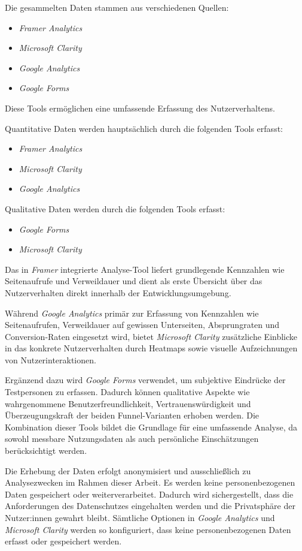 Die gesammelten Daten stammen aus verschiedenen Quellen:
\begin{itemize}
    \item \textit{Framer Analytics}
    \item \textit{Microsoft Clarity}
    \item \textit{Google Analytics}
    \item \textit{Google Forms}
\end{itemize} 
Diese Tools ermöglichen eine umfassende Erfassung des Nutzerverhaltens.

Quantitative Daten werden hauptsächlich durch die folgenden Tools erfasst:
\begin{itemize}
    \item \textit{Framer Analytics}
    \item \textit{Microsoft Clarity}
    \item \textit{Google Analytics}
\end{itemize}

Qualitative Daten werden durch die folgenden Tools erfasst:
\begin{itemize}
    \item \textit{Google Forms}
    \item \textit{Microsoft Clarity}
\end{itemize}

Das in \textit{Framer} integrierte Analyse-Tool liefert grundlegende 
Kennzahlen wie Seitenaufrufe und Verweildauer und dient als erste 
Übersicht über das Nutzerverhalten direkt innerhalb der Entwicklungsumgebung.

Während \textit{Google Analytics} 
primär zur Erfassung von Kennzahlen wie Seitenaufrufen, Verweildauer auf
gewissen Unterseiten, Absprungraten und Conversion-Raten eingesetzt wird, 
bietet \textit{Microsoft Clarity} zusätzliche Einblicke in das konkrete 
Nutzerverhalten durch Heatmaps sowie visuelle Aufzeichnungen von 
Nutzerinteraktionen.

Ergänzend dazu wird \textit{Google Forms} verwendet, um 
subjektive Eindrücke der Testpersonen zu erfassen. Dadurch können 
qualitative Aspekte wie wahrgenommene Benutzerfreundlichkeit, Vertrauenswürdigkeit 
und Überzeugungskraft der beiden Funnel-Varianten erhoben werden. Die 
Kombination dieser Tools bildet die Grundlage für eine 
umfassende Analyse, da sowohl messbare Nutzungsdaten als auch 
persönliche Einschätzungen berücksichtigt werden.

Die Erhebung der Daten erfolgt anonymisiert und ausschließlich zu 
Analysezwecken im Rahmen dieser Arbeit. Es werden keine personenbezogenen 
Daten gespeichert oder weiterverarbeitet. Dadurch wird sichergestellt, 
dass die Anforderungen des Datenschutzes eingehalten werden und die 
Privatsphäre der Nutzer:innen gewahrt bleibt.
Sämtliche Optionen in \textit{Google Analytics} und \textit{Microsoft Clarity} werden so
konfiguriert, dass keine personenbezogenen Daten erfasst oder gespeichert 
werden.

